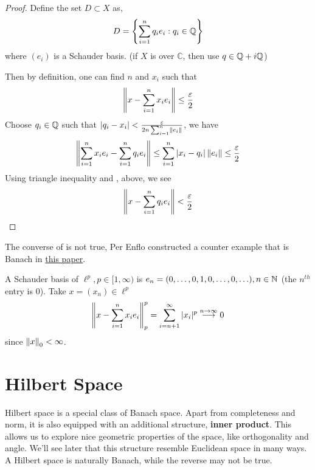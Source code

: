 \documentclass{article}
\begin{document}
\begin{proof}
    Define the set $D \subset X$ as,  
    $$
    D = \left\{\sum_{i=1}^n q_i e_i: q_i \in \mathbb{Q} \right\}
    $$  
    where $(e_i)$ is a Schauder basis. (if $X$ is over $\mathbb{C}$, then use $q \in \mathbb{Q} + i \mathbb{Q}$)
    
    Then by definition, one can find $n$ and $x_i$ such that  
    \begin{equation}
        \label{3}
        \left\|{x - \sum_{i=1}^n x_i e_i}\right\| \leq \frac{\varepsilon}{2}  
    \end{equation}
    Choose $q_i \in \mathbb{Q}$ such that $|q_i - x_i|<\frac{\varepsilon}{2n \sum_{i=1}^n \left\|{e_i}\right\|}$, we have  
    \begin{equation}
    \label{4}
        \left\|{\sum_{i=1}^n x_i e_i - \sum_{i=1}^n q_i e_i}\right\| \leq \sum_{i=1}^n |x_i-q_i| \left\|{e_i}\right\| \leq \frac{\varepsilon}{2}
    \end{equation}
    Using triangle inequality and ,  above, we see
    $$
    \left\|{x-\sum_{i=1}^n q_i e_i}\right\| < \frac{\varepsilon}{2}
    $$
\end{proof}

\begin{remark}
    The converse of  is not true, Per Enflo constructed a counter example that is Banach in \href{https://projecteuclid.org/download/pdf_1/euclid.acta/1485889774}{this paper}.
\end{remark}

\begin{example}
    A Schauder basis of $\ell^p, p\in [1, \infty)$ is $e_n=(0,\ldots, 0,1,0, \ldots,0,\ldots), n\in \mathbb{N}$ (the $n^{th}$ entry is $0$).  
    Take $x=(x_n)\in \ell^p$  
    $$
    \left\|{x-\sum_{i=1}^n x_ie_i}\right\|_p^p = \sum_{i=n+1}^{\infty} |x_i|^p \overset{n\to \infty}{\longrightarrow} 0
    $$  
    since $\left\|{x}\right\|_0 < \infty$.  
\end{example}



\section{Hilbert Space}  

\begin{unexaminable}
Hilbert space is a special class of Banach space. 
Apart from completeness and norm, it is also equipped with an additional structure, 
{\bf inner product}. This allows us to explore nice geometric properties of the space, 
like orthogonality and angle. We'll see later that this structure resemble Euclidean space in many ways. A Hilbert space is naturally Banach, while the reverse may not be true.
\end{unexaminable}
\end{document}

